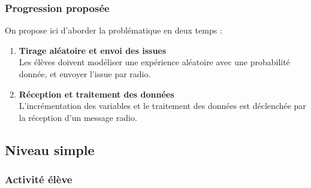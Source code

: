 \subsubsection{Progression proposée}


\begin{methode}
    On propose ici d'aborder la problématique en deux temps :
    
    \begin{enumerate}
        \item \textbf{Tirage aléatoire et envoi des issues} \\
            Les élèves doivent modéliser une expérience aléatoire avec une probabilité donnée, et envoyer l'issue par radio.
        \item \textbf{Réception et traitement des données}\\
            L'incrémentation des variables et le traitement des données est déclenchée par la réception d'un message radio.
        
            
    \end{enumerate}
\end{methode}


%
%
\newpage
\subsection{Niveau simple}
\subsubsection{Activité élève}





